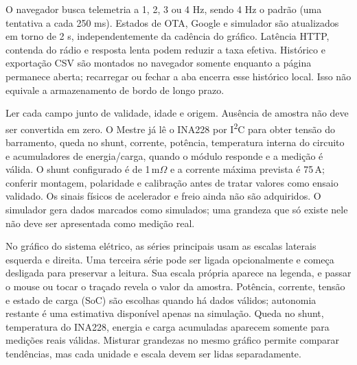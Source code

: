 O navegador busca telemetria a 1, 2, 3 ou 4 Hz, sendo 4 Hz o padrão (uma tentativa a cada 250 ms). Estados de OTA, Google e simulador são atualizados em torno de 2 s, independentemente da cadência do gráfico. Latência HTTP, contenda do rádio e resposta lenta podem reduzir a taxa efetiva. Histórico e exportação CSV são montados no navegador somente enquanto a página permanece aberta; recarregar ou fechar a aba encerra esse histórico local. Isso não equivale a armazenamento de bordo de longo prazo.

Ler cada campo junto de validade, idade e origem. Ausência de amostra não deve ser convertida em zero. O Mestre já lê o INA228 por I\textsuperscript{2}C para obter tensão do barramento, queda no shunt, corrente, potência, temperatura interna do circuito e acumuladores de energia/carga, quando o módulo responde e a medição é válida. O shunt configurado é de 1\,m$\Omega$ e a corrente máxima prevista é 75\,A; conferir montagem, polaridade e calibração antes de tratar valores como ensaio validado. Os sinais físicos de acelerador e freio ainda não são adquiridos. O simulador gera dados marcados como simulados; uma grandeza que só existe nele não deve ser apresentada como medição real.

No gráfico do sistema elétrico, as séries principais usam as escalas laterais esquerda e direita. Uma terceira série pode ser ligada opcionalmente e começa desligada para preservar a leitura. Sua escala própria aparece na legenda, e passar o mouse ou tocar o traçado revela o valor da amostra. Potência, corrente, tensão e estado de carga (SoC) são escolhas quando há dados válidos; autonomia restante é uma estimativa disponível apenas na simulação. Queda no shunt, temperatura do INA228, energia e carga acumuladas aparecem somente para medições reais válidas. Misturar grandezas no mesmo gráfico permite comparar tendências, mas cada unidade e escala devem ser lidas separadamente.

